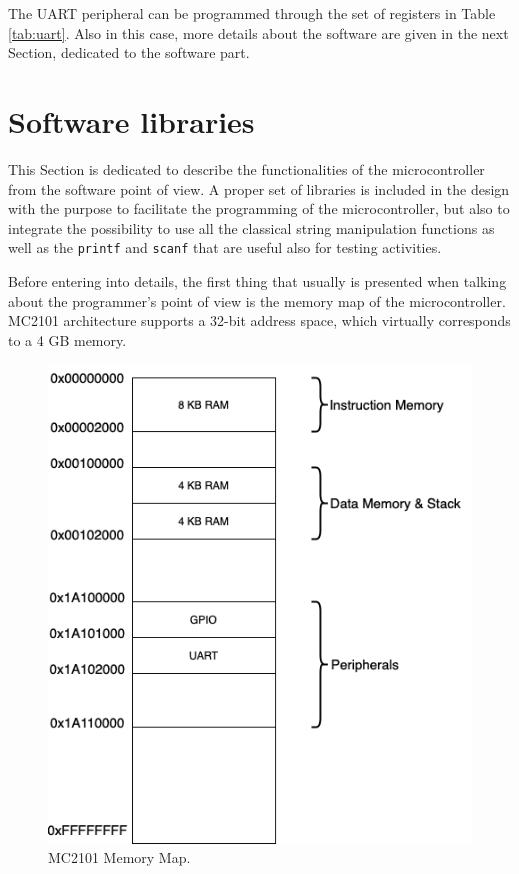 The UART peripheral can be programmed through the set of registers in Table \ref{tab:uart}. Also in this case, more details about the software are given in the next Section, dedicated to the software part.

\section{Software libraries}
This Section is dedicated to describe the functionalities of the microcontroller from the software point of view. A proper set of libraries is included in the design with the purpose to facilitate the programming of the microcontroller, but also to integrate the possibility to use all the classical string manipulation functions as well as the \texttt{printf} and \texttt{scanf} that are useful also for testing activities.

Before entering into details, the first thing that usually is presented when talking about the programmer's point of view is the memory map of the microcontroller. MC2101 architecture supports a 32-bit address space, which virtually corresponds to a 4 GB memory.

\begin{figure}[h]
\centering
\vspace{0.5cm}
\includegraphics[scale=0.7]{./images/memory}
\caption{MC2101 Memory Map.}
\label{fig:memory} %
\end{figure}

